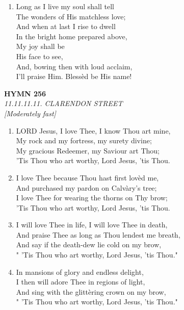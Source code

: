 \documentclass[11pt,a4paper]{article}
\begin{document}
\begin{enumerate}
    \item Long as I live my soul shall tell \\
        The wonders of His matchless love; \\
        And when at last I rise to dwell \\
        In the bright home prepared above, \\
            My joy shall be \\
            His face to see, \\
        And, bowing then with loud acclaim, \\
        I'll praise Him. Bless\`ed be His name!

\end{enumerate}

\newpage
\begin{center}
    {\Large \textbf{HYMN 256}}
    \\
    \textit{11.11.11.11. CLARENDON STREET}
    \\
    \textit{\small [Moderately fast]}
\end{center}
\vspace{1em}

\begin{enumerate}
    \item LORD Jesus, I love Thee, I know Thou art mine, \\
        My rock and my fortress, my surety divine; \\
        My gracious Redeemer, my Saviour art Thou; \\
        'Tis Thou who art worthy, Lord Jesus, 'tis Thou.

    \item I love Thee because Thou hast first lov\`ed me, \\
        And purchased my pardon on Calv\`ary's tree; \\
        I love Thee for wearing the thorns on Thy brow; \\
        'Tis Thou who art worthy, Lord Jesus, 'tis Thou.

    \item I will love Thee in life, I will love Thee in death, \\
        And praise Thee as long as Thou lendest me breath, \\
        And say if the death-dew lie cold on my brow, \\
        " 'Tis Thou who art worthy, Lord Jesus, 'tis Thou."

    \item In mansions of glory and endless delight, \\
        I then will adore Thee in regions of light, \\
        And sing with the glitt\`ering crown on my brow, \\
        " 'Tis Thou who art worthy, Lord Jesus, 'tis Thou."

\end{enumerate}
\end{document}
